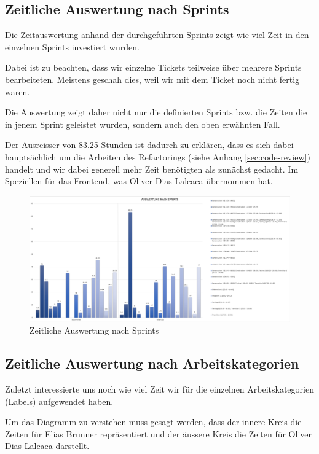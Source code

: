 \subsection{Zeitliche Auswertung nach Sprints}
Die Zeitauswertung anhand der durchgeführten Sprints zeigt wie viel Zeit in den einzelnen Sprints investiert wurden.

Dabei ist zu beachten, dass wir einzelne Tickets teilweise über mehrere Sprints bearbeiteten. Meistens geschah dies, weil wir mit dem Ticket noch nicht fertig waren.

Die Auswertung zeigt daher nicht nur die definierten Sprints bzw. die Zeiten die in jenem Sprint geleistet wurden, sondern auch den oben erwähnten Fall.

Der Ausreisser von 83.25 Stunden ist dadurch zu erklären, dass es sich dabei hauptsächlich um die Arbeiten des Refactorings (siehe Anhang \ref{sec:code-review}) handelt und wir dabei generell mehr Zeit benötigten als zunächst gedacht. Im Speziellen für das Frontend, was Oliver Dias-Lalcaca übernommen hat.

\begin{figure}[h]
  \centering
  \includegraphics[width=1\linewidth]{./img/zeitauswertung/ZeitauswertungSprints}
  \caption{Zeitliche Auswertung nach Sprints}
  \label{fig:comparison-sprints}
\end{figure}

\subsection{Zeitliche Auswertung nach Arbeitskategorien}
Zuletzt interessierte uns noch wie viel Zeit wir für die einzelnen Arbeitskategorien (Labels) aufgewendet haben.

Um das Diagramm zu verstehen muss gesagt werden, dass der innere Kreis die Zeiten für Elias Brunner repräsentiert und der äussere Kreis die Zeiten für Oliver Dias-Lalcaca darstellt. 

